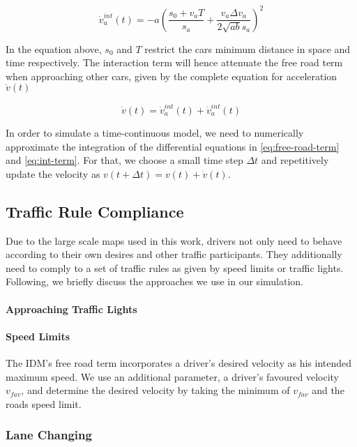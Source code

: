 \documentclass[10pt]{article}
\begin{document}
\begin{equation}
	\label{eq:int-term}
	\dot{v}_a^{int}(t) = - a ( \frac{s_0 + v_a T}{s_a} + \frac{v_a \Delta v_a}{2 \sqrt{ab} s_a} )^2
\end{equation}

In the equation above, $s_0$ and $T$ restrict the cars minimum distance in space and time respectively. The interaction term will hence attenuate the free road term when approaching other cars, given by the complete equation for acceleration $\dot{v}(t)$

\begin{equation}
	\dot{v}(t) = \dot{v}_a^{int}(t) + \dot{v}_a^{int}(t)
\end{equation}

In order to simulate a time-continuous model, we need to numerically approximate the integration of the differential equations in \ref{eq:free-road-term} and \ref{eq:int-term}. For that, we choose a small time step $\Delta t$ and repetitively update the velocity as $v(t + \Delta t) = v(t) + \dot{v}(t)$.

\subsection{Traffic Rule Compliance}
Due to the large scale maps used in this work, drivers not only need to behave according to their own desires and other traffic participants. They additionally need to comply to a set of traffic rules as given by speed limits or traffic lights. Following, we briefly discuss the approaches we use in our simulation.

\paragraph{Approaching Traffic Lights}

\paragraph{Speed Limits} The IDM's free road term incorporates a driver's desired velocity as his intended maximum speed. We use an additional parameter, a driver's favoured velocity $v_{fav}$, and determine the desired velocity by taking the minimum of $v_{fav}$ and the roads speed limit.


\subsubsection{Lane Changing}
\end{document}
